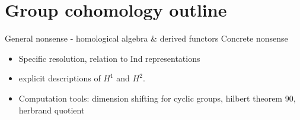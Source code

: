 \documentclass[a4paper]{article}
\begin{document}
\section{Group cohomology outline}

General nonsense - homological algebra & derived functors
Concrete nonsense
\begin{itemize}
	\item Specific resolution, relation to Ind representations
	\item explicit descriptions of \(H^{1}\) and \(H^{2}\).
	\item Computation tools:
		dimension shifting for cyclic groups,
		hilbert theorem 90,
		herbrand quotient

\end{itemize}
\end{document}
